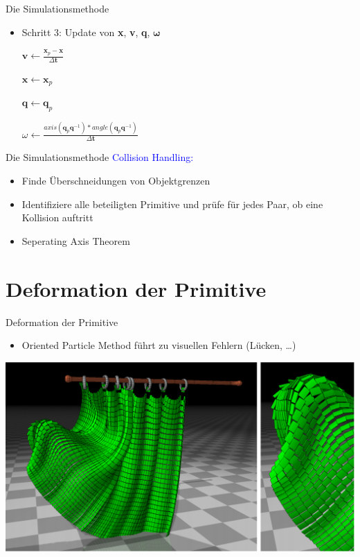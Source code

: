 \documentclass[t]{beamer}
\begin{document}
	\begin{frame}{Die Simulationsmethode}
		\begin{itemize}
			\item Schritt 3: Update von \textbf{x}, \textbf{v}, \textbf{q}, $\mathbf{\omega}$
				\begin{center}
					$\mathbf{v} \leftarrow \frac{\mathbf{x}_p - \mathbf{x}}{\Delta \mathbf{t}}$
				\end{center}
				\begin{center}
					$\mathbf{x} \leftarrow \mathbf{x}_p$
				\end{center}
					\begin{center}
					$\mathbf{q} \leftarrow \mathbf{q}_p$
				\end{center}
				\begin{center}
					$\omega \leftarrow \frac{axis(\mathbf{q}_p \mathbf{q}^{-1})*angle(\mathbf{q}_p \mathbf{q}^{-1})}{\Delta \mathbf{t}}$
				\end{center}
		\end{itemize}
	\end{frame}

	\begin{frame}{Die Simulationsmethode}
		\textcolor{blue}{Collision Handling:}
		\begin{itemize}
			\item Finde Überschneidungen von Objektgrenzen
			\item Identifiziere alle beteiligten Primitive und prüfe für jedes Paar, ob eine Kollision auftritt
			\item Seperating Axis Theorem
		\end{itemize}	
	\end{frame}
	
	\section{Deformation der Primitive}
	
	\begin{frame}{Deformation der Primitive}
		\begin{itemize}
			\item Oriented Particle Method führt zu visuellen Fehlern (Lücken, \dots)
		\end{itemize}
		\begin{center}
			\includegraphics[scale = 0.25]{Curtain_1.png}
		\end{center}
	\end{frame}
\end{document}
